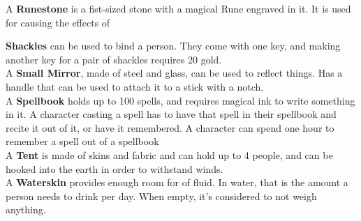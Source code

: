 A \textbf{Runestone} is a fist-sized stone with a magical Rune engraved in it. 
It is used for causing the effects of~

\textbf{Shackles} can be used to bind a person.
They come with one key, and making another key for a pair of shackles requires 20 gold.\\

A \textbf{Small Mirror}, made of steel and glass, can be used to reflect things.
Has a handle that can be used to attach it to a stick with a notch.\\

A \textbf{Spellbook} holds up to 100 spells, and requires magical ink to write something in it.
A character casting a spell has to have that spell in their spellbook and recite it out of it, or have it remembered.
A character can spend one hour to remember a spell out of a spellbook\\

A \textbf{Tent} is made of skins and fabric and can hold up to 4 people, and can be hooked into the earth in order to withstand winds.\\

A \textbf{Waterskin} provides enough room for  of fluid.
In water, that is the amount a person needs to drink per day.
When empty, it's considered to not weigh anything.\\